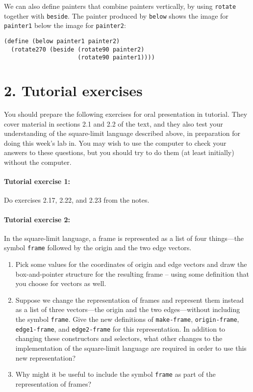 We can also define painters that combine painters vertically, by
using {\tt rotate} together with {\tt beside}.  The painter produced
by {\tt below} shows the image for {\tt painter1} below the image
for {\tt painter2}:

\begin{verbatim}
(define (below painter1 painter2)
  (rotate270 (beside (rotate90 painter2)
                     (rotate90 painter1))))
\end{verbatim}

\section{2. Tutorial exercises}

You should prepare the following exercises for oral presentation in
tutorial.  They cover material in sections 2.1 and 2.2 of the text,
and they also test your understanding of the square-limit language
described above, in preparation for doing this week's lab in.  You may
wish to use the computer to check your answers to these questions, but
you should try to do them (at least initially) without the computer.

\paragraph{Tutorial exercise 1:}
Do exercises 2.17, 2.22, and 2.23 from the notes.

\paragraph{Tutorial exercise 2:}
In the square-limit language, a frame is represented as a list of four
things---the symbol {\tt frame} followed by the origin and the two
edge vectors.

\begin{enumerate}

\item Pick some values for the coordinates of origin and edge vectors
and draw the box-and-pointer structure for the resulting frame --
using some definition that you choose for vectors as well.

\item Suppose we change the representation of frames and represent
them instead as a list of three vectors---the origin and the two
edges---without including the symbol {\tt frame}.  Give the new
definitions of {\tt make-frame}, {\tt origin-frame}, {\tt
edge1-frame}, and {\tt edge2-frame} for this representation.  In
addition to changing these constructors and selectors, what other
changes to the implementation of the square-limit language are
required in order to use this new representation?

\item Why might it be useful to include the symbol {\tt frame} as part
of the representation of frames?
\end{enumerate}

